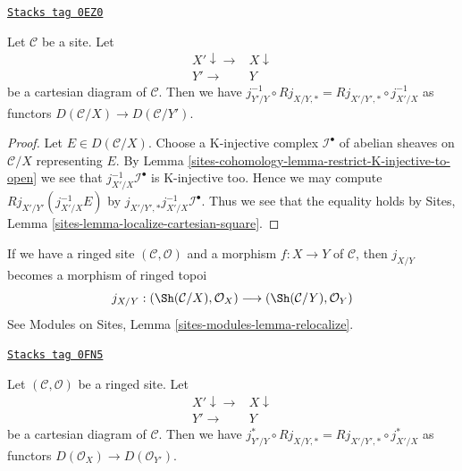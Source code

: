 \begin{lemma}
\label{sites-cohomology-lemma-localize-cartesian-square}
\href{https://stacks.math.columbia.edu/tag/0EZ0}{\texttt{Stacks tag 0EZ0}}

Let $\mathcal{C}$ be a site. Let
$$
\begin{array}{cc}X' \downarrow\longrightarrow & X \downarrow \\ Y' \longrightarrow & Y\end{array}
$$
be a cartesian diagram of $\mathcal{C}$. Then we have
$j_{Y'/Y}^{-1} \circ Rj_{X/Y, *} = Rj_{X'/Y', *} \circ j_{X'/X}^{-1}$
as functors $D(\mathcal{C}/X) \to D(\mathcal{C}/Y')$.
\end{lemma}

\begin{proof}
Let $E \in D(\mathcal{C}/X)$. Choose a K-injective complex
$\mathcal{I}^\bullet$ of abelian sheaves on $\mathcal{C}/X$
representing $E$. By Lemma \ref{sites-cohomology-lemma-restrict-K-injective-to-open}
we see that $j_{X'/X}^{-1}\mathcal{I}^\bullet$ is K-injective too.
Hence we may compute $Rj_{X'/Y'}(j_{X'/X}^{-1}E)$ by
$j_{X'/Y', *}j_{X'/X}^{-1}\mathcal{I}^\bullet$.
Thus we see that the equality holds by
Sites, Lemma \ref{sites-lemma-localize-cartesian-square}.
\end{proof}

If we have a ringed site $(\mathcal{C}, \mathcal{O})$
and a morphism $f : X \to Y$ of $\mathcal{C}$, then $j_{X/Y}$
becomes a morphism of ringed topoi
$$
j_{X/Y} :
(\Sh(\mathcal{C}/X), \mathcal{O}_X)
\longrightarrow
(\Sh(\mathcal{C}/Y), \mathcal{O}_Y)
$$
See Modules on Sites, Lemma \ref{sites-modules-lemma-relocalize}.

\begin{lemma}
\label{sites-cohomology-lemma-localize-cartesian-square-modules}
\href{https://stacks.math.columbia.edu/tag/0FN5}{\texttt{Stacks tag 0FN5}}

Let $(\mathcal{C}, \mathcal{O})$ be a ringed site. Let
$$
\begin{array}{cc}X' \downarrow\longrightarrow & X \downarrow \\ Y' \longrightarrow & Y\end{array}
$$
be a cartesian diagram of $\mathcal{C}$. Then we have
$j_{Y'/Y}^* \circ Rj_{X/Y, *} = Rj_{X'/Y', *} \circ j_{X'/X}^*$
as functors
$D(\mathcal{O}_X) \to D(\mathcal{O}_{Y'})$.
\end{lemma}

